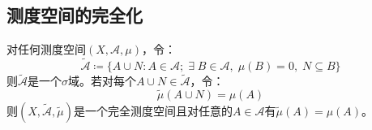 \subsection{测度空间的完全化}
\begin{theorem}\label{theo:CompleteMeasureSpace}
	对任何测度空间$(X,\mathscr{A},\mu)$，令：
	\begin{equation*}
		\tilde{\mathscr{A}}\coloneq\{A\cup N:A\in\mathscr{A};\;\exists\;B\in\mathscr{A},\;\mu(B)=0,\;N\subseteq B\}
	\end{equation*}
	则$\tilde{\mathscr{A}}$是一个$\sigma$域。若对每个$A\cup N\in\tilde{\mathscr{A}}$，令：
	\begin{equation*}
		\tilde{\mu}(A\cup N)=\mu(A)
	\end{equation*}
	则$(X,\tilde{\mathscr{A}},\tilde{\mu})$是一个完全测度空间且对任意的$A\in\mathscr{A}$有$\tilde{\mu}(A)=\mu(A)$。
\end{theorem}
